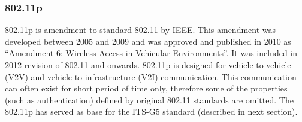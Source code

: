 \subsubsection{802.11p} \label{sec:802.11p}
% 
802.11p is amendment to standard 802.11 by IEEE. This amendment was developed between 2005 and 2009 and was approved and published in 2010 as \enquote{Amendment 6: Wireless Access in Vehicular Environments}. It was included in 2012 revision of 802.11 and onwards.
802.11p is designed for vehicle-to-vehicle (V2V) and vehicle-to-infrastructure (V2I) communication. This communication can often exist for short period of time only, therefore some of the properties (such as authentication) defined by original 802.11 standards are omitted. The 802.11p has served as base for the ITS-G5 standard (described in next section).\par
% 
% 